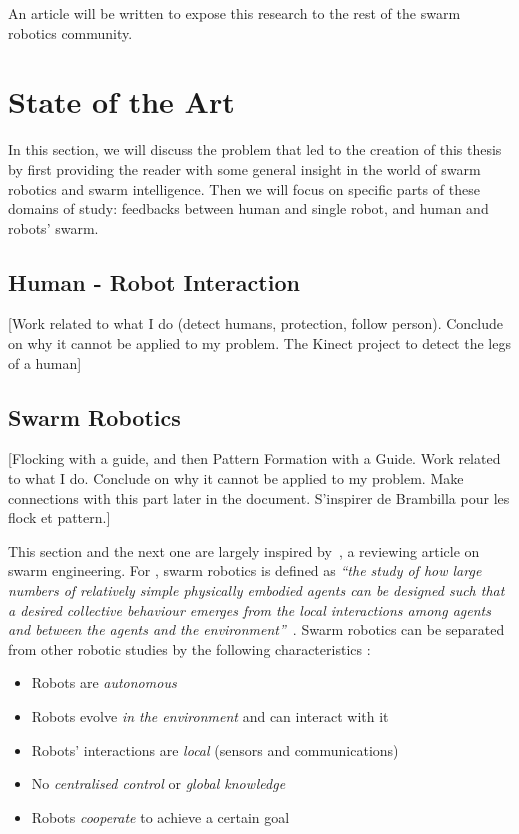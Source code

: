 \documentclass[oneside, a4paper, 12pt]{memoir}
\newcommand{\quot}[1]{\textit{\enquote{#1}}}
\begin{document}
	An article will be written to expose this research to the rest of the swarm robotics community.

\chapter{State of the Art}
	\label{chap:state_of_the_art}
	In this section, we will discuss the problem that led to the creation of this thesis by first providing the reader with some general insight in the world of swarm robotics and swarm intelligence. Then we will focus on specific parts of these domains of study: feedbacks between human and single robot, and human and robots' swarm.
	
	\section{Human - Robot Interaction}
	
	[Work related to what I do (detect humans, protection, follow person). Conclude on why it cannot be applied to my problem. The Kinect project to detect the legs of a human]

	\section{Swarm Robotics}
	
	[Flocking with a guide, and then Pattern Formation with a Guide. Work related to what I do. Conclude on why it cannot be applied to my problem. Make connections with this part later in the document. S'inspirer de Brambilla pour les flock et pattern.]
	
	This section and the next one are largely inspired by~\citet{brambilla2013swarm}, a reviewing article on swarm engineering. For \citet{csahin2005swarm}, swarm robotics is defined as \quot{the study of how large numbers of relatively simple physically embodied agents can be designed such that a desired collective behaviour emerges from the local interactions among agents and between the agents and the environment}~\citep{csahin2005swarm}. Swarm robotics can be separated from other robotic studies by the following characteristics \citep{brambilla2013swarm}:
	
\begin{itemize}
\item Robots are \emph{autonomous}
\item Robots evolve \emph{in the environment} and can interact with it
\item Robots' interactions are \emph{local} (sensors and communications)
\item No \emph{centralised control} or \emph{global knowledge}
\item Robots \emph{cooperate} to achieve a certain goal
\end{itemize}
\end{document}
